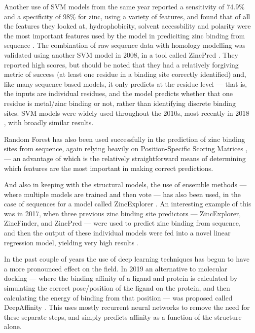 Another use of SVM models from the same year reported a sensitivity of 74.9\% and a specificity of 98\% for zinc, using a variety of features, and found that of all the features they looked at, hydrophobicity, solvent accessbility and polarity were the most important features used by the model in prediciting zinc binding from sequence \cite{lin2006prediction}. The combination of raw sequence data with homology modelling was validated using another SVM model in 2008, in a tool called ZincPred \cite{shu2008prediction}. They reported high scores, but should be noted that they had a relatively forgiving metric of success (at least one residue in a binding site correctly identified) and, like many sequence based models, it only predicts at the residue level --- that is, the inputs are individual residues, and the model predicts whether that one residue is metal/zinc binding or not, rather than identifying discrete binding sites. SVM models were widely used throughout the 2010s, most recently in 2018 \cite{srivastava2018prediction}, with broadly similar results.

Random Forest has also been used successfully in the prediction of zinc binding sites from sequence, again relying heavily on Position-Specific Scoring Matrices \cite{zheng2012}, \cite{Kumar2017} --- an advantage of which is the relatively straightforward means of determining which features are the most important in making correct predictions.

And also in keeping with the structural models, the use of ensemble methods --- where multiple models are trained and then vote --- has also been used, in the case of sequences for a model called ZincExplorer \cite{chen2013}. An interesting example of this was in 2017, when three previous zinc binding site predictors --- ZincExplorer, ZincFinder, and ZincPred --- were used to predict zinc binding from sequence, and then the output of these individual models were fed into a novel linear regression model, yielding very high results \cite{li2017}.

In the past couple of years the use of deep learning techniques has begun to have a more pronounced effect on the field. In 2019 an alternative to molecular docking --- where the binding affinity of a ligand and protein is calculated by simulating the correct pose/position of the ligand on the protein, and then calculating the energy of binding from that position --- was proposed called DeepAffinity \cite{karimi2019}. This uses mostly recurrent neural networks to remove the need for these separate steps, and simply predicts affinity as a function of the structure alone.

